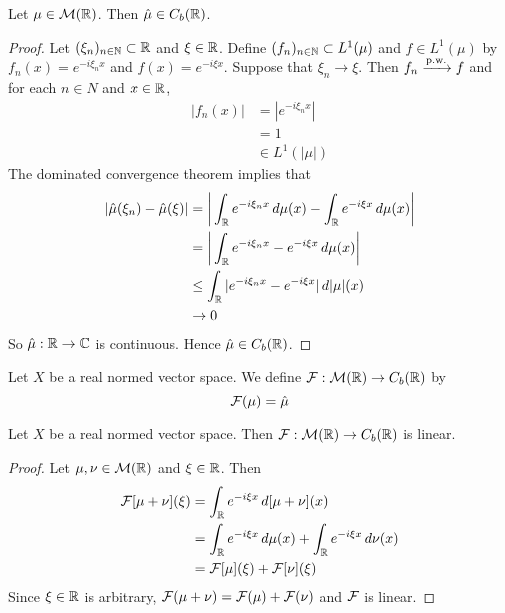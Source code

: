 \documentclass{book}
\begin{document}
	\begin{ex}
		Let $\mu \in \mathcal{M}(\mathbb{R})$. Then $\hat{\mu} \in C_b(\mathbb{R})$.
	\end{ex}
	
	\begin{proof}
		Let $(\xi_{n})_{n \in \mathbb{N}} \subset \mathbb{R}$ and $\xi \in \mathbb{R}$. Define $(f_n)_{n \in \mathbb{N}} \subset L^1 (\mu)$ and $f \in L^1(\mu)$ by $f_n(x) = e^{-i \xi_n x}$ and $f(x) = e^{-i \xi x}$. Suppose that $\xi_n \rightarrow \xi$. Then $f_n \xrightarrow{\text{p.w.}} f$ and for each $n \in N$ and $x \in \mathbb{R}$, 
		\begin{align*}
			|f_n(x)|
			&= |e^{-i \xi_n x}| \\
			& = 1 \\
			& \in L^1(|\mu|)
		\end{align*}
		The dominated convergence theorem implies that
		\begin{align*}
			|\hat{\mu}(\xi_n) - \hat{\mu}(\xi)| 
			& = \bigg| \int_{\mathbb{R}} e^{-i \xi_n x} \, d \mu(x) - \int_{\mathbb{R}} e^{-i \xi x} \, d \mu(x)\bigg| \\
			& =  \bigg| \int_{\mathbb{R}} e^{-i \xi_n x} - e^{-i \xi x} \, d \mu(x) \bigg| \\
			& \leq \int_{\mathbb{R}} |e^{-i \xi_n x} - e^{-i \xi x}| \, d|\mu|(x) \\
			& \rightarrow 0
		\end{align*}
		So $\hat{\mu}: \mathbb{R} \rightarrow \mathbb{C}$ is continuous. Hence $\hat{\mu} \in C_b(\mathbb{R})$.
	\end{proof}
	
	\begin{defn}
		Let $X$ be a real normed vector space. We define $\mathcal{F}: \mathcal{M}(\mathbb{R}) \rightarrow C_b(\mathbb{R})$ by $$\mathcal{F}(\mu) = \hat{\mu}$$
	\end{defn}
	
	\begin{ex}
		Let $X$ be a real normed vector space. Then $\mathcal{F}: \mathcal{M}(\mathbb{R}) \rightarrow C_b(\mathbb{R})$ is linear.
	\end{ex}
	
	\begin{proof}
		Let $\mu, \nu \in \mathcal{M}(\mathbb{R})$ and $\xi \in \mathbb{R}$. Then 
		\begin{align*}
			\mathcal{F}[\mu + \nu](\xi) 
			& = \int_{\mathbb{R}} e^{-i \xi x} \, d[\mu + \nu](x) \\
			& = \int_{\mathbb{R}} e^{-i \xi x} \, d \mu(x) + \int_{\mathbb{R}} e^{-i \xi x} \, d \nu(x) \\
			& = \mathcal{F}[\mu](\xi) + \mathcal{F}[\nu](\xi) 
		\end{align*}
		Since $\xi \in \mathbb{R}$ is arbitrary, $\mathcal{F}(\mu + \nu) = \mathcal{F}(\mu) + \mathcal{F}(\nu)$ and $\mathcal{F}$ is linear.
	\end{proof}
	
\end{document}
